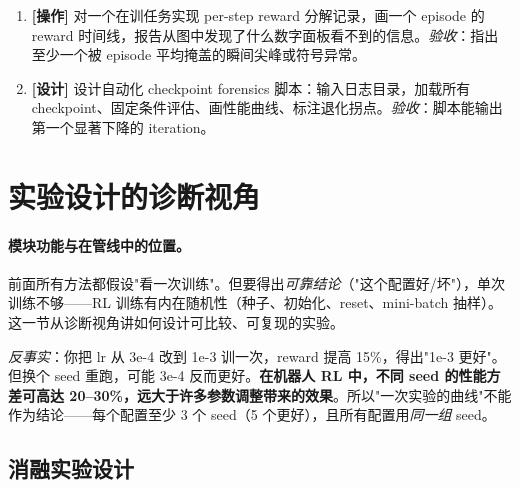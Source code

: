 
\begin{practice}[本节动手任务]
\begin{enumerate}
  \item \textbf{[操作]} 对一个在训任务实现 per-step reward 分解记录，画一个 episode 的 reward 时间线，报告从图中发现了什么数字面板看不到的信息。\emph{验收}：指出至少一个被 episode 平均掩盖的瞬间尖峰或符号异常。
  \item \textbf{[设计]} 设计自动化 checkpoint forensics 脚本：输入日志目录，加载所有 checkpoint、固定条件评估、画性能曲线、标注退化拐点。\emph{验收}：脚本能输出第一个显著下降的 iteration。
\end{enumerate}
\end{practice}

\section{实验设计的诊断视角}
\label{sec:rlmc-diag-experiment}

\paragraph{模块功能与在管线中的位置。}前面所有方法都假设"看一次训练"。但要得出\emph{可靠结论}（"这个配置好/坏"），单次训练不够——RL 训练有内在随机性（种子、初始化、reset、mini-batch 抽样）。这一节从诊断视角讲如何设计可比较、可复现的实验。

\begin{insight}\label{ins:rlmc-diag-seed}
\emph{反事实}：你把 lr 从 3e-4 改到 1e-3 训一次，reward 提高 15\%，得出"1e-3 更好"。但换个 seed 重跑，可能 3e-4 反而更好。\textbf{在机器人 RL 中，不同 seed 的性能方差可高达 20--30\%，远大于许多参数调整带来的效果}。所以"一次实验的曲线"不能作为结论——每个配置至少 3 个 seed（5 个更好），且所有配置用\emph{同一组} seed。
\end{insight}

\subsection{消融实验设计}

